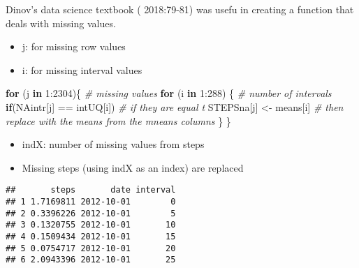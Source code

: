 \documentclass[
]{article}
\newenvironment{Shaded}{\begin{snugshade}}{\end{snugshade}}
\newcommand{\CommentTok}[1]{\textcolor[rgb]{0.56,0.35,0.01}{\textit{#1}}}
\newcommand{\ControlFlowTok}[1]{\textcolor[rgb]{0.13,0.29,0.53}{\textbf{#1}}}
\newcommand{\DecValTok}[1]{\textcolor[rgb]{0.00,0.00,0.81}{#1}}
\newcommand{\FunctionTok}[1]{\textcolor[rgb]{0.00,0.00,0.00}{#1}}
\newcommand{\NormalTok}[1]{#1}
\newcommand{\OtherTok}[1]{\textcolor[rgb]{0.56,0.35,0.01}{#1}}
\newcommand{\SpecialCharTok}[1]{\textcolor[rgb]{0.00,0.00,0.00}{#1}}
\begin{document}
Dinov's data science textbook ( 2018:79-81) was usefu in creating a
function that deals with missing values.

\begin{itemize}
\item
  j: for missing row values
\item
  i: for missing interval values
\end{itemize}

\begin{Shaded}
\begin{Highlighting}[]
\ControlFlowTok{for}\NormalTok{ (j }\ControlFlowTok{in} \DecValTok{1}\SpecialCharTok{:}\DecValTok{2304}\NormalTok{)\{       }\CommentTok{\# missing values }
  \ControlFlowTok{for}\NormalTok{ (i }\ControlFlowTok{in} \DecValTok{1}\SpecialCharTok{:}\DecValTok{288}\NormalTok{) \{     }\CommentTok{\# number of intervals }
    \ControlFlowTok{if}\NormalTok{(NAintr[j] }\SpecialCharTok{==}\NormalTok{ intUQ[i]) }\CommentTok{\# if they are equal t}
\NormalTok{      STEPSna[j] }\OtherTok{\textless{}{-}}\NormalTok{ means[i] }\CommentTok{\# then replace with the means from the mneans columns}
\NormalTok{  \}}
\NormalTok{\}}
\end{Highlighting}
\end{Shaded}

\begin{itemize}
\item
  indX: number of missing values from steps
\item
  Missing steps (using indX as an index) are replaced
\end{itemize}

\begin{Shaded}
\end{Shaded}

\begin{verbatim}
##       steps       date interval
## 1 1.7169811 2012-10-01        0
## 2 0.3396226 2012-10-01        5
## 3 0.1320755 2012-10-01       10
## 4 0.1509434 2012-10-01       15
## 5 0.0754717 2012-10-01       20
## 6 2.0943396 2012-10-01       25
\end{verbatim}
\end{document}
